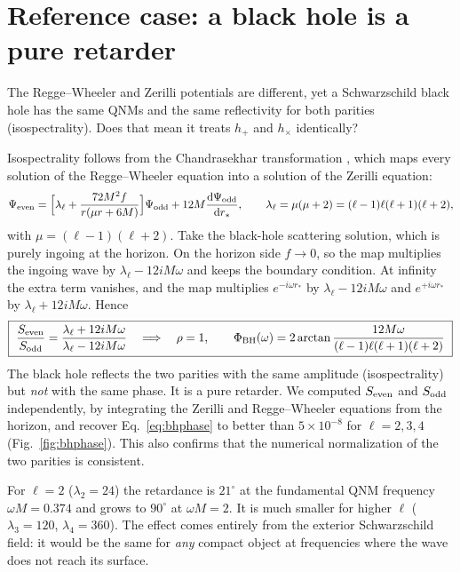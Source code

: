 \section{Reference case: a black hole is a pure retarder}\label{sec:bh}
\begin{question}
The Regge--Wheeler and Zerilli potentials are different, yet a Schwarzschild black hole has the same QNMs and the same
reflectivity for both parities (isospectrality). Does that mean it treats $h_+$ and $h_\times$ identically?
\end{question}
Isospectrality follows from the Chandrasekhar transformation \cite{Chandrasekhar83}, which maps every solution of the
Regge--Wheeler equation into a solution of the Zerilli equation:
\begin{equation}
\Psi_{\rm even}=\Big[\lambda_\ell+\frac{72M^2f}{r(\mu r+6M)}\Big]\Psi_{\rm odd}+12M\frac{\mathrm{d}\Psi_{\rm odd}}{\mathrm{d} r_*},\qquad
\lambda_\ell=\mu(\mu+2)=(\ell-1)\ell(\ell+1)(\ell+2),
\end{equation}
with $\mu=(\ell-1)(\ell+2)$. Take the black-hole scattering solution, which is purely ingoing at the horizon. On the
horizon side $f\to0$, so the map multiplies the ingoing wave by $\lambda_\ell-12iM\omega$ and keeps the boundary condition.
At infinity the extra term vanishes, and the map multiplies $e^{-i\omega r_*}$ by $\lambda_\ell-12iM\omega$ and $e^{+i\omega r_*}$ by
$\lambda_\ell+12iM\omega$. Hence
\begin{equation}
\boxed{\ \frac{S_{\rm even}}{S_{\rm odd}}=\frac{\lambda_\ell+12iM\omega}{\lambda_\ell-12iM\omega}\quad\Longrightarrow\quad
\rho=1,\qquad \Phi_{\rm BH}(\omega)=2\arctan\frac{12M\omega}{(\ell-1)\ell(\ell+1)(\ell+2)}\ }
\label{eq:bhphase}
\end{equation}
The black hole reflects the two parities with the same amplitude (isospectrality) but \emph{not} with the same phase.
It is a pure retarder. We computed $S_{\rm even}$ and $S_{\rm odd}$ independently, by integrating the Zerilli and
Regge--Wheeler equations from the horizon, and recover Eq.~\eqref{eq:bhphase} to better than $5\times10^{-8}$ for
$\ell=2,3,4$ (Fig.~\ref{fig:bhphase}). This also confirms that the numerical normalization of the two parities is
consistent.

For $\ell=2$ ($\lambda_2=24$) the retardance is $21^\circ$ at the fundamental QNM frequency $\omega M=0.374$ and grows to
$90^\circ$ at $\omega M=2$. It is much smaller for higher $\ell$ ($\lambda_3=120$, $\lambda_4=360$). The effect comes entirely
from the exterior Schwarzschild field: it would be the same for \emph{any} compact object at frequencies where the wave does
not reach its surface.

